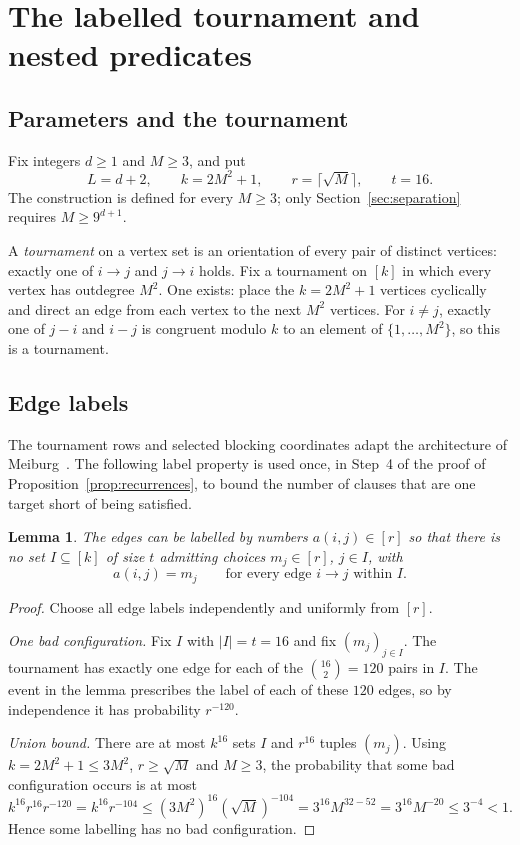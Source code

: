 \documentclass[11pt]{article}
\newtheorem{lemma}[theorem]{Lemma}
\theoremstyle{definition}
\theoremstyle{remark}
\begin{document}
\section{The labelled tournament and nested predicates}
\label{sec:construction}

\subsection{Parameters and the tournament}
Fix integers \(d\ge1\) and \(M\ge3\), and put
\[
 L=d+2,\qquad k=2M^2+1,\qquad r=\lceil\sqrt M\rceil,
 \qquad t=16.
\]
The construction is defined for every \(M\ge3\); only
Section~\ref{sec:separation} requires \(M\ge9^{d+1}\).

A \emph{tournament} on a vertex set is an orientation of every pair of distinct
vertices: exactly one of \(i\to j\) and \(j\to i\) holds.
Fix a tournament on \([k]\) in which every vertex has outdegree \(M^2\).
One exists: place the \(k=2M^2+1\) vertices cyclically and direct an edge from
each vertex to the next \(M^2\) vertices. For \(i\ne j\), exactly one of
\(j-i\) and \(i-j\) is congruent modulo \(k\) to an element of
\(\{1,\ldots,M^2\}\), so this is a tournament.

\subsection{Edge labels}
The tournament rows and selected blocking coordinates adapt the architecture
of Meiburg~\cite[Sections~3.1 and~5.2--5.5]{Meiburg2026}. The following label
property is used once, in Step~4 of the proof of
Proposition~\ref{prop:recurrences}, to bound the number of clauses that are one
target short of being satisfied.

\begin{lemma}\label{lem:labelling}
The edges can be labelled by numbers \(a(i,j)\in[r]\) so that there is
no set \(I\subseteq[k]\) of size \(t\) admitting choices
\(m_j\in[r]\), \(j\in I\), with
\[
 a(i,j)=m_j \qquad\text{for every edge }i\to j\text{ within }I.
\]
\end{lemma}
\begin{proof}
Choose all edge labels independently and uniformly from \([r]\).

\emph{One bad configuration.} Fix \(I\) with \(|I|=t=16\) and fix
\((m_j)_{j\in I}\). The tournament has exactly one edge for each of the
\(\binom{16}{2}=120\) pairs in \(I\). The event in the lemma prescribes the
label of each of these \(120\) edges, so by independence it has probability
\(r^{-120}\).

\emph{Union bound.} There are at most \(k^{16}\) sets \(I\) and \(r^{16}\)
tuples \((m_j)\). Using \(k=2M^2+1\le3M^2\), \(r\ge\sqrt M\) and \(M\ge3\),
the probability that some bad configuration occurs is at most
\[
 k^{16}r^{16}r^{-120}=k^{16}r^{-104}\le (3M^2)^{16}(\sqrt M)^{-104}
 =3^{16}M^{32-52}=3^{16}M^{-20}\le 3^{-4}<1.
\]
Hence some labelling has no bad configuration.
\end{proof}
\end{document}
